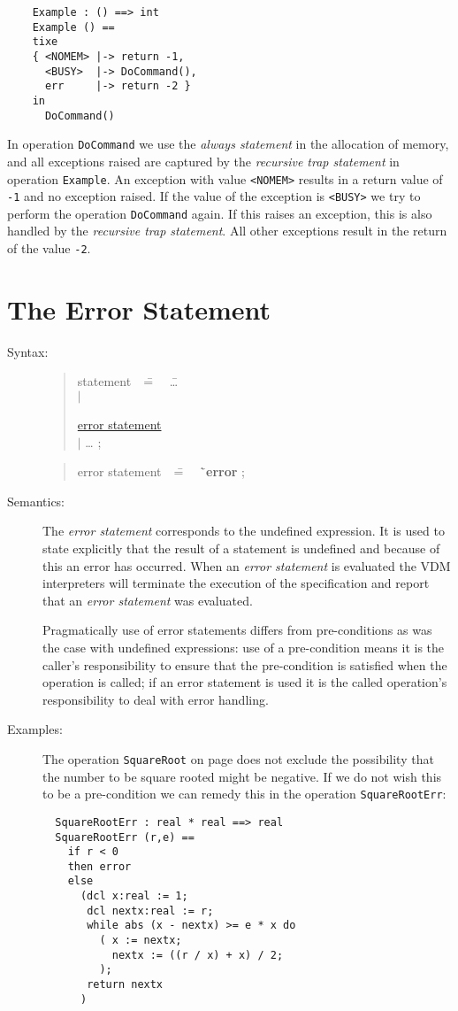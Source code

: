 \documentclass{overturerepchap}
\newcommand{\Rule}[2]{
  \begin{quote}\begin{tabbing}
    #1\index{#1}\ \ \= = \ \ \= #2  ; %

  \end{tabbing}\end{quote}
  }
\newcommand{\Ruleref}[1]{
  \hyperlink{rule:#1}{#1}}
\newcommand{\dsep}{\\ \> $|$ \>}
\newcommand{\Lop}[1]{`{\bf\ttfamily #1}\Quote}
\begin{document}
{\begin{description}
\begin{lstlisting}
    Example : () ==> int
    Example () ==
    tixe
    { <NOMEM> |-> return -1,
      <BUSY>  |-> DoCommand(),
      err     |-> return -2 }
    in
      DoCommand()
  \end{lstlisting}
  In operation {\tt DoCommand} we use the {\it always statement\/} in the
  allocation of memory, and all exceptions raised are captured by the {\it
    recursive trap statement\/} in operation {\tt Example}. An exception
  with value {\tt <NOMEM>} results in a return value of {\tt -1} and no
  exception raised. If the value of the exception is {\tt <BUSY>} we try to
  perform the operation {\tt DoCommand} again. If this raises an exception,
  this is also handled by the {\it recursive trap statement}. All other
  exceptions result in the return of the value {\tt -2}.
\end{description}

\section{The Error Statement}

\begin{description}
\item[Syntax:]
  \Rule{statement}{
    \ldots \dsep
    \Ruleref{error statement} \dsep
    \ldots
    }

  \Rule{error statement}{
    \Lop{error}
    }

\item[Semantics:] The {\it error statement} corresponds to the
undefined expression. It is used to state explicitly that the result
of a statement is undefined and because of this an error has occurred.
When an {\it error statement} is evaluated the
VDM interpreters will
terminate the execution of the specification and report that an {\it
error statement} was evaluated.

  Pragmatically use of error statements differs from
  pre-conditions as was the case with undefined expressions: use of a
  pre-condition means it is the caller's
  responsibility to ensure that the pre-condition is satisfied when
  the operation is called; if an error statement is used it is the
  called operation's responsibility to deal with error handling.


\item[Examples:] The operation \texttt{SquareRoot} on page
  \pageref{squarerootDef} does not exclude
  the possibility that the number to be square rooted might be
  negative. If we do not wish this to be a pre-condition we can
remedy this in the operation \texttt{SquareRootErr}:
  \begin{lstlisting}
  SquareRootErr : real * real ==> real
  SquareRootErr (r,e) ==
    if r < 0
    then error
    else
      (dcl x:real := 1;
       dcl nextx:real := r;
       while abs (x - nextx) >= e * x do
         ( x := nextx;
           nextx := ((r / x) + x) / 2;
         );
       return nextx
      )
  \end{lstlisting}
\end{description}

}
\end{document}

